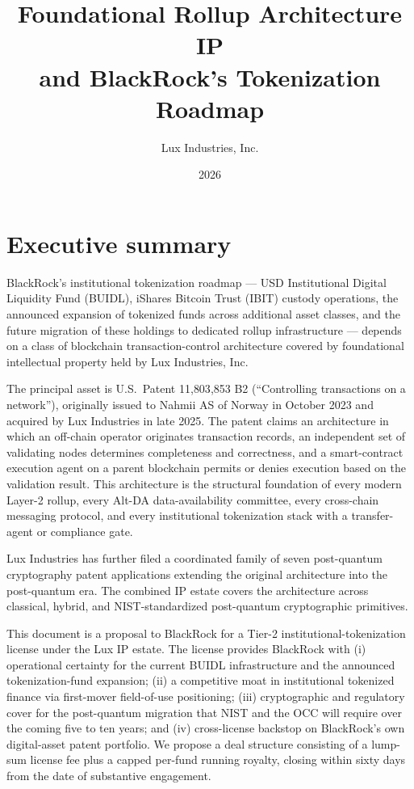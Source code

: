 \documentclass[11pt,letterpaper]{article}
\title{Foundational Rollup Architecture IP\\and BlackRock's Tokenization Roadmap}
\author{Lux Industries, Inc.}
\date{2026}
\begin{document}
\luxcoverpage

\section*{Executive summary}

BlackRock's institutional tokenization roadmap --- USD Institutional Digital Liquidity Fund (BUIDL), iShares Bitcoin Trust (IBIT) custody operations, the announced expansion of tokenized funds across additional asset classes, and the future migration of these holdings to dedicated rollup infrastructure --- depends on a class of blockchain transaction-control architecture covered by foundational intellectual property held by Lux Industries, Inc.

The principal asset is U.S.\ Patent 11{,}803{,}853 B2 (``Controlling transactions on a network''), originally issued to Nahmii AS of Norway in October 2023 and acquired by Lux Industries in late 2025. The patent claims an architecture in which an off-chain operator originates transaction records, an independent set of validating nodes determines completeness and correctness, and a smart-contract execution agent on a parent blockchain permits or denies execution based on the validation result. This architecture is the structural foundation of every modern Layer-2 rollup, every Alt-DA data-availability committee, every cross-chain messaging protocol, and every institutional tokenization stack with a transfer-agent or compliance gate.

Lux Industries has further filed a coordinated family of seven post-quantum cryptography patent applications extending the original architecture into the post-quantum era. The combined IP estate covers the architecture across classical, hybrid, and NIST-standardized post-quantum cryptographic primitives.

This document is a proposal to BlackRock for a Tier-2 institutional-tokenization license under the Lux IP estate. The license provides BlackRock with (i) operational certainty for the current BUIDL infrastructure and the announced tokenization-fund expansion; (ii) a competitive moat in institutional tokenized finance via first-mover field-of-use positioning; (iii) cryptographic and regulatory cover for the post-quantum migration that NIST and the OCC will require over the coming five to ten years; and (iv) cross-license backstop on BlackRock's own digital-asset patent portfolio. We propose a deal structure consisting of a lump-sum license fee plus a capped per-fund running royalty, closing within sixty days from the date of substantive engagement.
\end{document}
